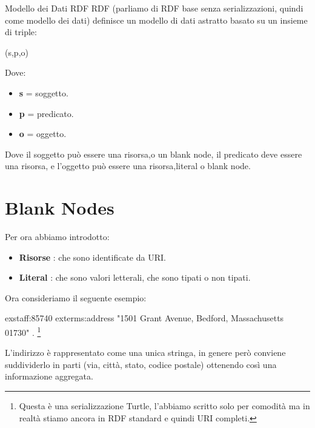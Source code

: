 \begin{definition}{Modello dei Dati RDF}
    RDF (parliamo di RDF base senza serializzazioni, quindi come modello dei dati) definisce un modello di dati astratto basato su un insieme di triple:
    \begin{center}
        (s,p,o)
    \end{center}
    Dove:
    \begin{itemize}
        \item \textbf{s} = soggetto.
        \item \textbf{p} = predicato.
        \item \textbf{o} = oggetto.
    \end{itemize}
    Dove il soggetto può essere una risorsa,o un blank node, il predicato deve essere una risorsa, e l'oggetto può essere una risorsa,literal o blank node.
\end{definition}


\newpage

\section{Blank Nodes}
Per ora abbiamo introdotto:
\begin{itemize}
    \item \textbf{Risorse} : che sono identificate da URI.
    \item \textbf{Literal} : che sono valori letterali, che sono tipati o non tipati.
\end{itemize}
Ora consideriamo il seguente esempio:
\begin{center}
    exstaff:85740 exterms:address "1501 Grant Avenue, Bedford, Massachusetts 01730" . \footnote{Questa è una serializzazione Turtle, l'abbiamo scritto solo per comodità ma in realtà stiamo ancora in RDF standard e quindi URI completi.}
\end{center}
L'indirizzo è rappresentato come una unica stringa, in genere però conviene suddividerlo in
parti (via, città, stato, codice postale) ottenendo così una informazione aggregata.

